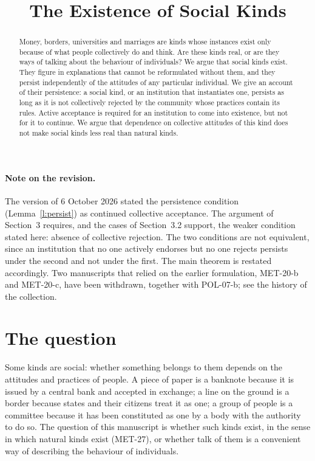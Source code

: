 \documentclass{situationist-preprint}
\title{The Existence of Social Kinds}
\begin{document}
\maketitle

\begin{abstract}
Money, borders, universities and marriages are kinds whose instances exist only because of what people collectively do and think. Are these kinds real, or are they ways of talking about the behaviour of individuals? We argue that social kinds exist. They figure in explanations that cannot be reformulated without them, and they persist independently of the attitudes of any particular individual. We give an account of their persistence: a social kind, or an institution that instantiates one, persists as long as it is not collectively rejected by the community whose practices contain its rules. Active acceptance is required for an institution to come into existence, but not for it to continue. We argue that dependence on collective attitudes of this kind does not make social kinds less real than natural kinds.
\end{abstract}

\paragraph{Note on the revision.} The version of 6 October 2026 stated the persistence condition (Lemma~\ref{l:persist}) as continued collective acceptance. The argument of Section~3 requires, and the cases of Section~3.2 support, the weaker condition stated here: absence of collective rejection. The two conditions are not equivalent, since an institution that no one actively endorses but no one rejects persists under the second and not under the first. The main theorem is restated accordingly. Two manuscripts that relied on the earlier formulation, MET-20-b and MET-20-c, have been withdrawn, together with POL-07-b; see the history of the collection.

\section{The question}

Some kinds are social: whether something belongs to them depends on the attitudes and practices of people. A piece of paper is a banknote because it is issued by a central bank and accepted in exchange; a line on the ground is a border because states and their citizens treat it as one; a group of people is a committee because it has been constituted as one by a body with the authority to do so. The question of this manuscript is whether such kinds exist, in the sense in which natural kinds exist (MET-27), or whether talk of them is a convenient way of describing the behaviour of individuals.
\end{document}
